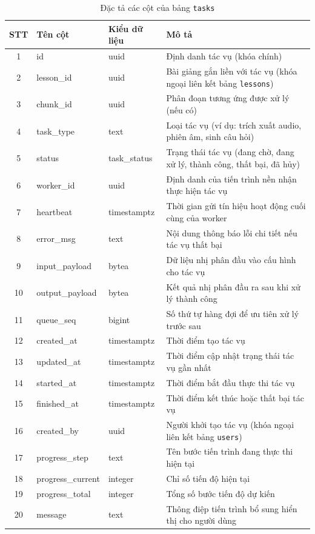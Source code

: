 \documentclass[../DoAn.tex]{subfiles}
\begin{document}
\begin{table}[H]
\centering
\small
\renewcommand{\arraystretch}{1.3}
\begin{tabular}{|c|l|l|p{6.2cm}|}
\hline
\textbf{STT} & \textbf{Tên cột} & \textbf{Kiểu dữ liệu} & \textbf{Mô tả} \\ \hline
1 & id & uuid & Định danh tác vụ (khóa chính) \\ \hline
2 & lesson\_id & uuid & Bài giảng gắn liền với tác vụ (khóa ngoại liên kết bảng \texttt{lessons}) \\ \hline
3 & chunk\_id & uuid & Phân đoạn tương ứng được xử lý (nếu có) \\ \hline
4 & task\_type & text & Loại tác vụ (ví dụ: trích xuất audio, phiên âm, sinh câu hỏi) \\ \hline
5 & status & task\_status & Trạng thái tác vụ (đang chờ, đang xử lý, thành công, thất bại, đã hủy) \\ \hline
6 & worker\_id & uuid & Định danh của tiến trình nền nhận thực hiện tác vụ \\ \hline
7 & heartbeat & timestamptz & Thời gian gửi tín hiệu hoạt động cuối cùng của worker \\ \hline
8 & error\_msg & text & Nội dung thông báo lỗi chi tiết nếu tác vụ thất bại \\ \hline
9 & input\_payload & bytea & Dữ liệu nhị phân đầu vào cấu hình cho tác vụ \\ \hline
10 & output\_payload & bytea & Kết quả nhị phân đầu ra sau khi xử lý thành công \\ \hline
11 & queue\_seq & bigint & Số thứ tự hàng đợi để ưu tiên xử lý trước sau \\ \hline
12 & created\_at & timestamptz & Thời điểm tạo tác vụ \\ \hline
13 & updated\_at & timestamptz & Thời điểm cập nhật trạng thái tác vụ gần nhất \\ \hline
14 & started\_at & timestamptz & Thời điểm bắt đầu thực thi tác vụ \\ \hline
15 & finished\_at & timestamptz & Thời điểm kết thúc hoặc thất bại tác vụ \\ \hline
16 & created\_by & uuid & Người khởi tạo tác vụ (khóa ngoại liên kết bảng \texttt{users}) \\ \hline
17 & progress\_step & text & Tên bước tiến trình đang thực thi hiện tại \\ \hline
18 & progress\_current & integer & Chỉ số tiến độ hiện tại \\ \hline
19 & progress\_total & integer & Tổng số bước tiến độ dự kiến \\ \hline
20 & message & text & Thông điệp tiến trình bổ sung hiển thị cho người dùng \\ \hline
\end{tabular}
\caption{Đặc tả các cột của bảng \texttt{tasks}}
\label{tbl:tasks}
\end{table}
\end{document}
